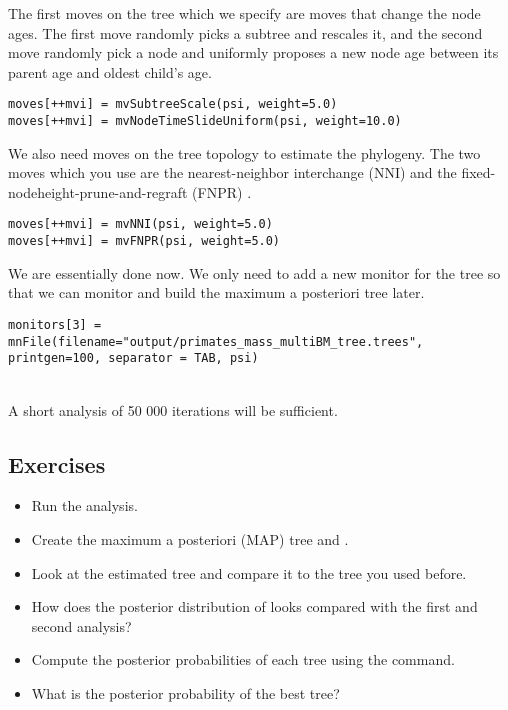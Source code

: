 The first moves on the tree which we specify are moves that change the node ages. The first move randomly picks a subtree and rescales it, and the second move randomly pick a node and uniformly proposes a new node age between its parent age and oldest child's age.
{\tt \small \begin{snugshade*}
\begin{lstlisting}
moves[++mvi] = mvSubtreeScale(psi, weight=5.0)
moves[++mvi] = mvNodeTimeSlideUniform(psi, weight=10.0)
\end{lstlisting}
\end{snugshade*}}

We also need moves on the tree topology to estimate the phylogeny. The two moves which you use are the nearest-neighbor interchange (NNI) and the fixed-nodeheight-prune-and-regraft (FNPR) \citep{Hohna2012}.
{\tt \small \begin{snugshade*}
\begin{lstlisting}
moves[++mvi] = mvNNI(psi, weight=5.0)
moves[++mvi] = mvFNPR(psi, weight=5.0)\end{lstlisting}
\end{snugshade*}}
We are essentially done now. We  only need to add a new monitor for the tree so that we can monitor and build the maximum a posteriori tree later.
{\tt \small \begin{snugshade*}
\begin{lstlisting}
monitors[3] = mnFile(filename="output/primates_mass_multiBM_tree.trees", printgen=100, separator = TAB, psi)
\end{lstlisting}
\end{snugshade*}}

\noindent \\ \impmark A short analysis of 50 000 iterations will be sufficient.


\subsection*{Exercises}

\begin{itemize}
\item
Run the analysis.
\item
Create the maximum a posteriori (MAP) tree  and .
\item
Look at the estimated tree and compare it to the tree you used before.
\item 
How does the posterior distribution of  looks compared with the first and second analysis?
\item
Compute the posterior probabilities of each tree using the  command.
\item
What is the posterior probability of the best tree?
\end{itemize}

